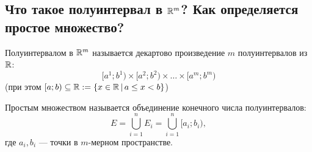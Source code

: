 
\subsection{Что такое полуинтервал в $\mathbb{R}^m$? Как определяется простое множество?}
    
    \begin{definition}
       Полуинтервалом в $\mathbb{R}^m$ называется декартово произведение $m$ полуинтервалов из $\mathbb{R}$:
       \[ [a^1; b^1) \times [a^2; b^2) \times \dots \times [a^m; b^m) \]
       (при этом $[a; b) \subseteq \mathbb{R} := \{ x \in \mathbb{R} \,|\, a \le x < b \}$)
    \end{definition}
    
    \begin{definition}
       Простым множеством называется объединение конечного числа полуинтервалов:
       \[ E = \bigcup\limits_{i=1}^{n} E_i = \bigcup\limits_{i=1}^{n} [a_i; b_i), \]
       где $a_i, b_i$ --- точки в $m$-мерном пространстве.\\
    \end{definition}
